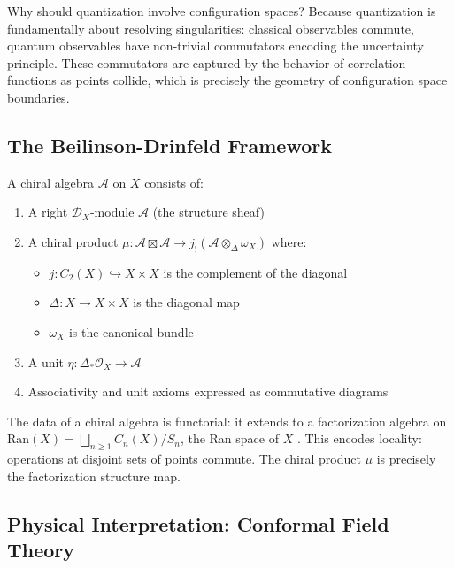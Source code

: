 \begin{principle}
Why should quantization involve configuration spaces? Because quantization is fundamentally about resolving singularities: classical observables commute, quantum observables have non-trivial commutators encoding the uncertainty principle. These commutators are captured by the behavior of correlation functions as points collide, which is precisely the geometry of configuration space boundaries.
\end{principle}

\subsection{The Beilinson-Drinfeld Framework}

A chiral algebra $\mathcal{A}$ on $X$ \cite{BD04} consists of:
\begin{enumerate}
\item A right $\mathcal{D}_X$-module $\mathcal{A}$ (the structure sheaf)
\item A chiral product $\mu: \mathcal{A} \boxtimes \mathcal{A} \to j_!(\mathcal{A} \otimes_\Delta \omega_X)$ where:
   \begin{itemize}
   \item $j: C_2(X) \hookrightarrow X \times X$ is the complement of the diagonal
   \item $\Delta: X \to X \times X$ is the diagonal map
   \item $\omega_X$ is the canonical bundle
   \end{itemize}
\item A unit $\eta: \Delta_* \mathcal{O}_X \to \mathcal{A}$
\item Associativity and unit axioms expressed as commutative diagrams
\end{enumerate}

\begin{remark}
The data of a chiral algebra is functorial: it extends to a factorization algebra on $\text{Ran}(X) = \bigsqcup_{n \geq 1} C_n(X)/S_n$, the Ran space of $X$ \cite{BD04, CG17}. This encodes locality: operations at disjoint sets of points commute. The chiral product $\mu$ is precisely the factorization structure map.
\end{remark}

\subsection{Physical Interpretation: Conformal Field Theory}

